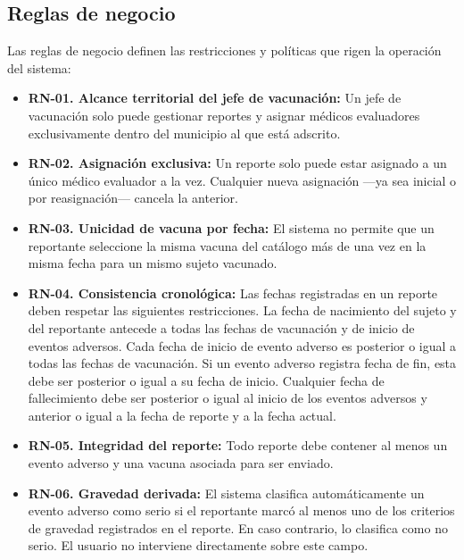 \documentclass[12pt,letterpaper]{article}
\begin{document}
\subsection{Reglas de negocio}

Las reglas de negocio definen las restricciones y políticas que rigen la operación del sistema:

\begin{itemize}
\item \textbf{RN-01. Alcance territorial del jefe de vacunación:} Un jefe de vacunación solo puede gestionar reportes y asignar médicos evaluadores exclusivamente dentro del municipio al que está adscrito.

\item \textbf{RN-02. Asignación exclusiva:} Un reporte solo puede estar asignado a un único médico evaluador a la vez. Cualquier nueva asignación —ya sea inicial o por reasignación— cancela la anterior.

\item \textbf{RN-03. Unicidad de vacuna por fecha:} El sistema no permite que un reportante seleccione la misma vacuna del catálogo más de una vez en la misma fecha para un mismo sujeto vacunado.

\item \textbf{RN-04. Consistencia cronológica:} Las fechas registradas en un reporte deben respetar las siguientes restricciones. La fecha de nacimiento del sujeto y del reportante antecede a todas las fechas de vacunación y de inicio de eventos adversos. Cada fecha de inicio de evento adverso es posterior o igual a todas las fechas de vacunación. Si un evento adverso registra fecha de fin, esta debe ser posterior o igual a su fecha de inicio. Cualquier fecha de fallecimiento debe ser posterior o igual al inicio de los eventos adversos y anterior o igual a la fecha de reporte y a la fecha actual.

\item \textbf{RN-05. Integridad del reporte:} Todo reporte debe contener al menos un evento adverso y una vacuna asociada para ser enviado.

\item \textbf{RN-06. Gravedad derivada:} El sistema clasifica automáticamente un evento adverso como serio si el reportante marcó al menos uno de los criterios de gravedad registrados en el reporte. En caso contrario, lo clasifica como no serio. El usuario no interviene directamente sobre este campo.


\end{itemize}
\end{document}
